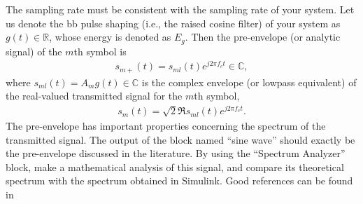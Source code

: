 \documentclass[12pt,a4paper]{article}
\begin{document}
The sampling rate must be consistent with the sampling rate of your system. Let us denote the \gls{bb} pulse shaping (i.e., the raised cosine filter) of your system as \(g\left( t \right) \in \mathbb{R}\), whose energy is denoted as \(E_g\). Then the pre-envelope (or analytic signal) of the \(m\)th symbol is
\begin{align}
    s_{m+}\left( t \right) = s_{ml}\left( t \right) e^{j 2\pi f_c t} \in \mathbb{C},
\end{align}
where \(s_{ml}\left( t \right) = A_m g\left( t \right) \in \mathbb{C}\) is the complex envelope (or lowpass equivalent) of the real-valued transmitted signal for the \(m\)th symbol,
\begin{align}
    s_{m}\left( t \right) = \sqrt{2} \Re{s_{ml}\left( t \right) e^{j 2\pi f_c t}}.
\end{align}
The pre-envelope has important properties concerning the spectrum of the transmitted signal. The output of the block named ``sine wave'' should exactly be the pre-envelope discussed in the literature. By using the ``Spectrum Analyzer'' block, make a mathematical analysis of this signal, and compare its theoretical spectrum with the spectrum obtained in Simulink. Good references can be found in \cite{mengaliSynchronizationTechniquesDigital1997,meyrDigitalCommunicationReceivers1998,proakisDigitalCommunications2007}

\printbibliography
\end{document}
